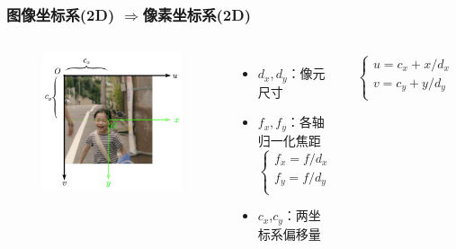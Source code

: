 \documentclass[aspectratio=43]{beamer}
\begin{document}
\begin{frame}
	\frametitle{图像坐标系(2D) $\Rightarrow$像素坐标系(2D)}
	\begin{columns}
		\column{5cm}
		\begin{figure}
			\begin{center}
				\includegraphics[scale=0.35]{相机坐标系到像素坐标系}
			\end{center}
		\end{figure}
		\column{6.5cm}
		\begin{itemize}
			\item $d_x,d_y$：像元尺寸
			\item $f_x,f_y$：各轴归一化焦距
			\vspace{-0.6em}
			$$\begin{cases}
				f_x={{f}\big/{d_x}}\\
				f_y={{f}\big/{d_y}}\\
			\end{cases}$$
			\vspace{-0.6em}
			\item $c_x$,$c_y$：两坐标系偏移量
		\end{itemize}
		\begin{gather}
			\left\{\begin{array}{c}
	u=c_x+x/d_x\\
	v=c_y+y/d_y\\

\end{array}
\end{gather}
\end{columns}
\end{frame}
\end{document}
